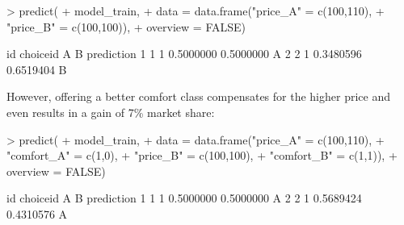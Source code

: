 \documentclass[article]{jss}
\begin{document}
\begin{Schunk}
\begin{Sinput}
> predict(
+    model_train,
+    data = data.frame("price_A" = c(100,110),
+                      "price_B" = c(100,100)),
+    overview = FALSE)
\end{Sinput}
\begin{Soutput}
  id choiceid         A         B prediction
1  1        1 0.5000000 0.5000000          A
2  2        1 0.3480596 0.6519404          B
\end{Soutput}
\end{Schunk}

However, offering a better comfort class compensates for the higher price and even results in a gain of 7\% market share:

\begin{Schunk}
\begin{Sinput}
> predict(
+    model_train,
+    data = data.frame("price_A"   = c(100,110),
+                      "comfort_A" = c(1,0),
+                      "price_B"   = c(100,100),
+                      "comfort_B" = c(1,1)),
+    overview = FALSE)
\end{Sinput}
\begin{Soutput}
  id choiceid         A         B prediction
1  1        1 0.5000000 0.5000000          A
2  2        1 0.5689424 0.4310576          A
\end{Soutput}
\end{Schunk}
\end{document}
